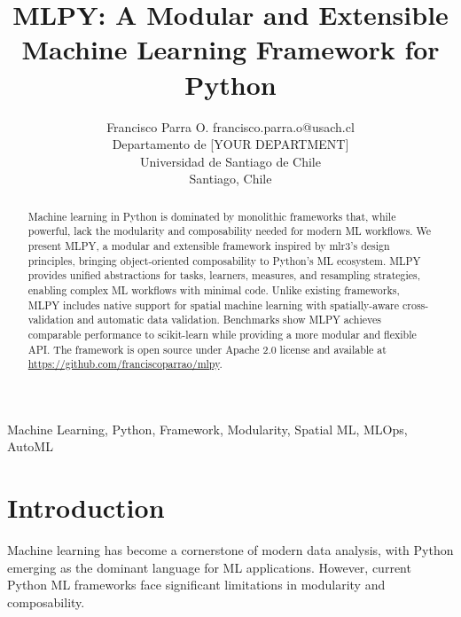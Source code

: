 \documentclass[twoside,11pt]{article}
\begin{document}
\title{MLPY: A Modular and Extensible Machine Learning Framework for Python}

\author{\name Francisco Parra O. \email francisco.parra.o@usach.cl \\
       \addr Departamento de [YOUR DEPARTMENT]\\
       Universidad de Santiago de Chile\\
       Santiago, Chile}


\maketitle

\begin{abstract}
Machine learning in Python is dominated by monolithic frameworks that, while
powerful, lack the modularity and composability needed for modern ML workflows.
We present MLPY, a modular and extensible framework inspired by mlr3's design
principles, bringing object-oriented composability to Python's ML ecosystem.
MLPY provides unified abstractions for tasks, learners, measures, and resampling
strategies, enabling complex ML workflows with minimal code. Unlike existing
frameworks, MLPY includes native support for spatial machine learning with
spatially-aware cross-validation and automatic data validation. Benchmarks show
MLPY achieves comparable performance to scikit-learn while providing a more
modular and flexible API. The framework is open source under Apache 2.0 license
and available at \url{https://github.com/franciscoparrao/mlpy}.
\end{abstract}

\begin{keywords}
  Machine Learning, Python, Framework, Modularity, Spatial ML, MLOps, AutoML
\end{keywords}

\section{Introduction}
\label{sec:intro}

Machine learning has become a cornerstone of modern data analysis, with Python
emerging as the dominant language for ML applications. However, current Python
ML frameworks face significant limitations in modularity and composability.
\end{document}
